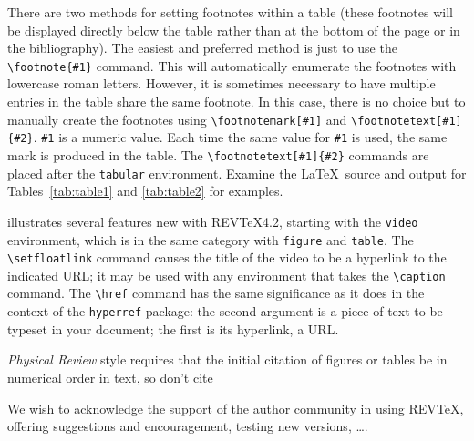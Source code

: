 \documentclass[%
 reprint,
 amsmath,amssymb,
 aps,
]{revtex4-2}
\begin{document}
There are two methods for setting footnotes within a table (these
footnotes will be displayed directly below the table rather than at
the bottom of the page or in the bibliography). The easiest
and preferred method is just to use the \verb+\footnote{#1}+
command. This will automatically enumerate the footnotes with
lowercase roman letters. However, it is sometimes necessary to have
multiple entries in the table share the same footnote. In this case,
there is no choice but to manually create the footnotes using
\verb+\footnotemark[#1]+ and \verb+\footnotetext[#1]{#2}+.
\texttt{\#1} is a numeric value. Each time the same value for
\texttt{\#1} is used, the same mark is produced in the table. The
\verb+\footnotetext[#1]{#2}+ commands are placed after the \texttt{tabular}
environment. Examine the \LaTeX\ source and output for
Tables~\ref{tab:table1} and \ref{tab:table2}
for examples.

 
illustrates several features new with REV\TeX4.2,
starting with the \texttt{video} environment, which is in the same category with
\texttt{figure} and \texttt{table}.%
The \verb+\setfloatlink+ command causes the title of the video to be a hyperlink to the
indicated URL; it may be used with any environment that takes the \verb+\caption+
command.
The \verb+\href+ command has the same significance as it does in the context of
the \texttt{hyperref} package: the second argument is a piece of text to be 
typeset in your document; the first is its hyperlink, a URL.

\textit{Physical Review} style requires that the initial citation of
figures or tables be in numerical order in text, so don't cite

\begin{acknowledgments}
We wish to acknowledge the support of the author community in using
REV\TeX{}, offering suggestions and encouragement, testing new versions,
\dots.
\end{acknowledgments}
\end{document}
